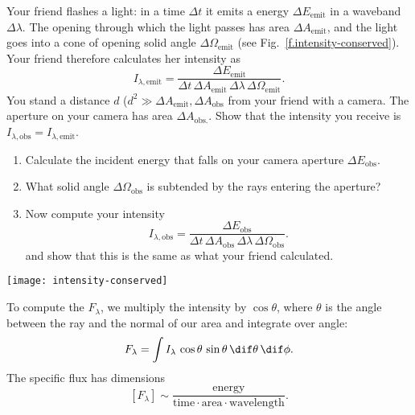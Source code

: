\begin{exercisebox}
\label{ex.intensity-conserved}
Your friend flashes a light: in a time $\Delta t$ it emits a energy $\Delta E_{\mathrm{emit}}$ in a waveband $\Delta\lambda$. The opening through which the light passes has area $\Delta A_{\mathrm{emit}}$, and the light goes into a cone of opening solid angle $\Delta\Omega_{\mathrm{emit}}$ (see Fig.~\ref{f.intensity-conserved}). Your friend therefore calculates her intensity as
\[	
	I_{\lambda,\mathrm{emit}} = \frac{\Delta E_{\mathrm{emit}}}{\Delta t\,\Delta A_{\mathrm{emit}}\,\Delta\lambda \,\Delta\Omega_{\mathrm{emit}}}.
\]
You stand a distance $d$ ($d^{2}\gg \Delta A_{\mathrm{emit}}, \Delta A_{\mathrm{obs}}$ from your friend with a camera. The aperture on your camera has area $\Delta A_{\mathrm{obs.}}$. Show that the intensity you receive is $I_{\lambda,\mathrm{obs}} = I_{\lambda,\mathrm{emit}}$.
\begin{enumerate}
\item Calculate the incident energy that falls on your camera aperture $\Delta E_{\mathrm{obs}}$.
\item What solid angle $\Delta\Omega_{\mathrm{obs}}$ is subtended by the rays entering the aperture?
\item Now compute your intensity
\[	
	I_{\lambda,\mathrm{obs}} = \frac{\Delta E_{\mathrm{obs}}}{\Delta t\,\Delta A_{\mathrm{obs}}\,\Delta\lambda \,\Delta\Omega_{\mathrm{obs}}}.
\]
and show that this is the same as what your friend calculated.
\end{enumerate}
\end{exercisebox}
\begin{figure*}
\texttt{[image: intensity-conserved]}
\caption[Schematic of intensity being constant]{\label{f.intensity-conserved} Schematic for exercise \ref{ex.intensity-conserved}.}
\end{figure*}

To compute the  $F_{\lambda}$, we multiply the intensity by $\cos\theta$, where $\theta$ is the angle between the ray and the normal of our area and integrate over angle:
\begin{equation}\label{e.specific-flux}
F_{\lambda} =  \int I_{\lambda}\,\cos\theta\,\sin\theta\,\dif\theta\,\dif\phi.
\end{equation}
The specific flux has dimensions
\[
	[F_{\lambda}] \sim \frac{\textrm{energy}}{\textrm{time}\cdot\textrm{area}\cdot\textrm{wavelength}}.
\]


